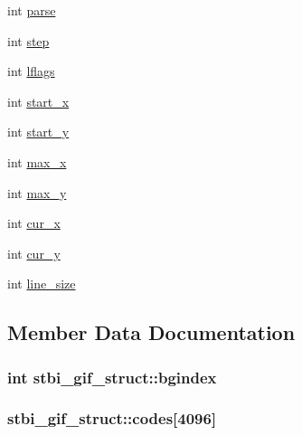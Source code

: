 \begin{DoxyCompactItemize}
int \hyperlink{structstbi__gif__struct_a7a57ec19955875d52af26851ef332db8}{parse}
\item 
int \hyperlink{structstbi__gif__struct_a61556e0a3ff8f19fa80401de5da1f079}{step}
\item 
int \hyperlink{structstbi__gif__struct_a01e6981357bbd283177f70f87050a49d}{lflags}
\item 
int \hyperlink{structstbi__gif__struct_ad3899ad3323686e963a7322e9a80bb05}{start\+\_\+x}
\item 
int \hyperlink{structstbi__gif__struct_a7f4974b80d6e6f4f56b5fd02a9c1c121}{start\+\_\+y}
\item 
int \hyperlink{structstbi__gif__struct_a02391438194b161d16bdf95878be6a66}{max\+\_\+x}
\item 
int \hyperlink{structstbi__gif__struct_aff3410e0fff097d4719e54096f6da69b}{max\+\_\+y}
\item 
int \hyperlink{structstbi__gif__struct_adbc7ae7e9ff2e2abdf66eb0e1a4b3ffb}{cur\+\_\+x}
\item 
int \hyperlink{structstbi__gif__struct_ac61865216c4b578c235f5b8170c2036c}{cur\+\_\+y}
\item 
int \hyperlink{structstbi__gif__struct_a5b7d7625c253025ff5ee4169afbf06b7}{line\+\_\+size}
\end{DoxyCompactItemize}


\subsection{Member Data Documentation}
\hypertarget{structstbi__gif__struct_a0d3690bdbbf0b772d5369c0a29b77cc1}{}
\subsubsection[{bgindex}]{\setlength{\rightskip}{0pt plus 5cm}int stbi\+\_\+gif\+\_\+struct\+::bgindex}\label{structstbi__gif__struct_a0d3690bdbbf0b772d5369c0a29b77cc1}
\hypertarget{structstbi__gif__struct_a4644d2fe2c84e410ab235ea415e9a740}{}
\subsubsection[{codes}]{ stbi\+\_\+gif\+\_\+struct\+::codes\mbox{[}4096\mbox{]}}\label{structstbi__gif__struct_a4644d2fe2c84e410ab235ea415e9a740}
\hypertarget{structstbi__gif__struct_aa10fee29a36ac4b9cae98300f839d091}{}

